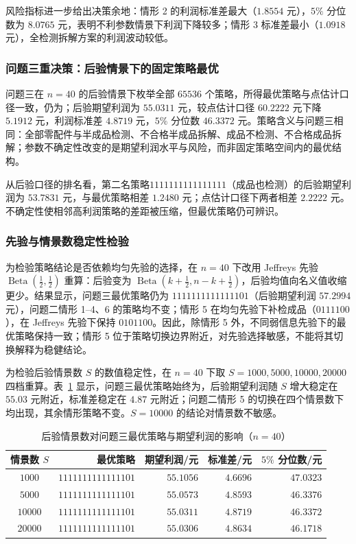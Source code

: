 风险指标进一步给出决策余地：情形 2 的利润标准差最大（$1.8554$ 元），$5\%$ 分位数为 $8.0765$ 元，表明不利参数情景下利润下降较多；情形 3 标准差最小（$1.0918$ 元），全检测拆解方案的利润波动较低。

\subsubsection{问题三重决策：后验情景下的固定策略最优}

问题三在 $n=40$ 的后验情景下枚举全部 $65536$ 个策略，所得最优策略与点估计口径一致，仍为\allowbreak；后验期望利润为 $55.0311$ 元，较点估计口径 $60.2222$ 元下降 $5.1912$ 元，利润标准差 $4.8719$ 元，$5\%$ 分位数 $46.3372$ 元。策略含义与问题三相同：全部零配件与半成品检测、不合格半成品拆解、成品不检测、不合格成品拆解；参数不确定性改变的是期望利润水平与风险，而非固定策略空间内的最优结构。

从后验口径的排名看，第二名策略\allowbreak $1111111111111111$\allowbreak（成品也检测）的后验期望利润为 $53.7831$ 元，与最优策略相差 $1.2480$ 元；点估计口径下两者相差 $2.2222$ 元。不确定性使相邻高利润策略的差距被压缩，但最优策略仍可辨识。

\subsubsection{先验与情景数稳定性检验}

为检验策略结论是否依赖均匀先验的选择，在 $n=40$ 下改用 Jeffreys 先验 $\operatorname{Beta}(\tfrac12,\tfrac12)$ 重算：后验变为 $\operatorname{Beta}(k+\tfrac12,n-k+\tfrac12)$，后验均值向名义值收缩更少。结果显示，问题三最优策略仍为 $1111111111111101$（后验期望利润 $57.2994$ 元），问题二情形 1--4、6 的策略均不变；情形 5 在均匀先验下补检成品（$0111100$），在 Jeffreys 先验下保持 $0101100$。因此，除情形 5 外，不同弱信息先验下的最优策略保持一致；情形 5 位于策略切换边界附近，对先验选择敏感，不能将其切换解释为稳健结论。

为检验后验情景数 $S$ 的数值稳定性，在 $n=40$ 下取 $S=1000,5000,10000,20000$ 四档重算。表~\ref{tab:q4-scenario-stability} 显示，问题三最优策略始终为\allowbreak，后验期望利润随 $S$ 增大稳定在 $55.03$ 元附近，标准差稳定在 $4.87$ 元附近；问题二情形 5 的切换在四个情景数下均出现，其余情形策略不变。$S=10000$ 的结论对情景数不敏感。

\begin{table}[H]
  \centering
  \caption{后验情景数对问题三最优策略与期望利润的影响（$n=40$）}
  \label{tab:q4-scenario-stability}
  \begin{tabular}{crrrr}
    \toprule
    情景数 $S$ & 最优策略 & 期望利润/元 & 标准差/元 & $5\%$ 分位数/元 \\
    \midrule
    $1000$ & $1111111111111101$ & $55.1056$ & $4.6696$ & $47.0323$ \\
    $5000$ & $1111111111111101$ & $55.0573$ & $4.8593$ & $46.3376$ \\
    $10000$ & $1111111111111101$ & $55.0311$ & $4.8719$ & $46.3372$ \\
    $20000$ & $1111111111111101$ & $55.0306$ & $4.8634$ & $46.1718$ \\
    \bottomrule
  \end{tabular}
\end{table}

